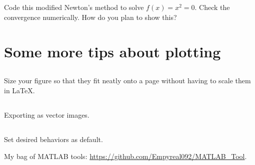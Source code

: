 \documentclass[11pt,letterpaper]{article}
\begin{document}
\subsection{}
Code this modified Newton's method to solve $f(x) = x^2 = 0$. Check the convergence numerically. How do you plan to show this?

\newpage
\section{Some more tips about plotting}
\subsection{}
Size your figure so that they fit neatly onto a page without having to scale them in \LaTeX. 

\subsection{}
Exporting as vector images.

\subsection{}
Set desired behaviors as default.

\vspace{1cm}
My bag of MATLAB tools: \url{https://github.com/Empyreal092/MATLAB_Tool}.



    
    
% 
% 
\end{document}
